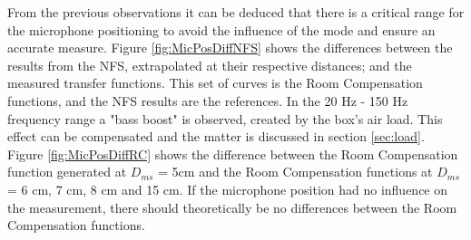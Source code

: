 \documentclass{report}
\begin{document}
From the previous observations it can be deduced that there is a critical range for the microphone positioning to avoid the influence of the mode and ensure an accurate measure. Figure \ref{fig:MicPosDiffNFS} shows the differences between the results from the NFS, extrapolated at their respective distances; and the measured transfer functions. This set of curves is the Room Compensation functions, and the NFS results are the references. In the 20 Hz - 150 Hz frequency range a "bass boost" is observed, created by the box's air load. This effect can be compensated and the matter is discussed in section \ref{sec:load}.\\

Figure \ref{fig:MicPosDiffRC} shows the difference between the Room Compensation function generated at $D_{ms}$ = 5cm and the Room Compensation functions at $D_{ms}$ = 6 cm, 7 cm, 8 cm and 15 cm. If the microphone position had no influence on the measurement, there should theoretically be no differences between the Room Compensation functions. \\
\end{document}
